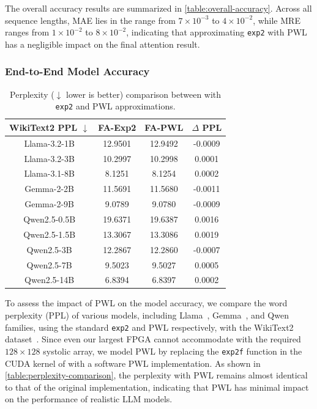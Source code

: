 The overall accuracy results are summarized in \autoref{table:overall-accuracy}.
Across all sequence lengths, MAE lies in the range from $7 \times 10^{-3}$ to $4 \times 10^{-2}$,
while MRE ranges from $1 \times 10^{-2}$ to $8 \times 10^{-2}$,
indicating that approximating \texttt{exp2} with PWL
has a negligible impact on the final attention result.

\subsubsection{End-to-End Model Accuracy}

\begin{table}[t]
\centering
\caption{Perplexity ($\downarrow$ lower is better) comparison between \FA{} 
with \texttt{exp2} and PWL approximations.}
\label{table:perplexity-comparison}
\begin{tabular}{cS[table-format=2.4]S[table-format=2.4]S[table-format=2.4]}
\toprule
\textbf{WikiText2 PPL $\downarrow$} & \textbf{FA-Exp2} & \textbf{FA-PWL} & \textbf{$\Delta$ PPL} \\
\midrule
Llama-3.2-1B & 12.9501 & 12.9492 & -0.0009 \\
Llama-3.2-3B & 10.2997 & 10.2998 & 0.0001 \\
Llama-3.1-8B & 8.1251 & 8.1254 & 0.0002 \\
Gemma-2-2B   & 11.5691 & 11.5680 & -0.0011 \\
Gemma-2-9B   & 9.0789  & 9.0780  & -0.0009 \\
Qwen2.5-0.5B & 19.6371 & 19.6387 & 0.0016 \\
Qwen2.5-1.5B & 13.3067 & 13.3086 & 0.0019 \\
Qwen2.5-3B   & 12.2867 & 12.2860 & -0.0007 \\
Qwen2.5-7B   & 9.5023  & 9.5027  & 0.0005 \\
Qwen2.5-14B  & 6.8394  & 6.8397  & 0.0002 \\
\bottomrule
\end{tabular}
\end{table}

To assess the impact of PWL on the model accuracy, we compare the word perplexity (PPL) of various models, including
Llama~\cite{llama3}, Gemma~\cite{gemma}, and Qwen~\cite{qwen25} families,
using the standard \texttt{exp2} and PWL respectively, with the 
WikiText2 dataset~\cite{wikitext2}.
Since even our largest FPGA cannot accommodate \MSAGA{} with the required $128 \times 128$ systolic array, we model PWL by replacing the \texttt{exp2f} function in the CUDA kernel of 
\FA{} with a software PWL implementation. 
As shown in \autoref{table:perplexity-comparison}, the perplexity with PWL remains almost identical to that of the original 
implementation, indicating that PWL has minimal impact on the performance of realistic LLM models.



